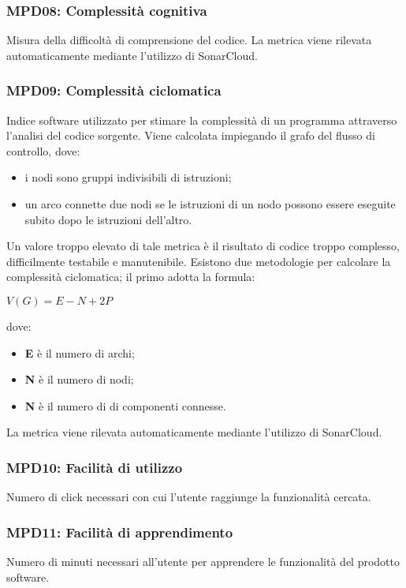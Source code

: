 \subsubsection{MPD08: Complessità cognitiva}
Misura della difficoltà di comprensione del codice.
La metrica viene rilevata automaticamente mediante l’utilizzo di {SonarCloud}\glo.

\subsubsection{MPD09: Complessità ciclomatica}
Indice software utilizzato per stimare la complessità di un programma attraverso l’analisi del codice sorgente.
Viene calcolata impiegando il grafo del flusso di controllo, dove:
\begin{itemize}
    \item i nodi sono gruppi indivisibili di istruzioni;
    \item un arco connette due nodi se le istruzioni di un nodo possono essere eseguite subito dopo le istruzioni dell’altro.
\end{itemize}
Un valore troppo elevato di tale metrica è il risultato di codice troppo complesso, difficilmente testabile e manutenibile.
Esistono due metodologie per calcolare la complessità ciclomatica; il primo adotta la formula:
\begin{center}
    $V(G) = \displaystyle E - N + 2P$
\end{center}
dove:
\begin{itemize}
    \item \textbf{E} è il numero di archi;
    \item \textbf{N} è il numero di nodi;
    \item \textbf{N} è il numero di di componenti connesse.
\end{itemize}
La metrica viene rilevata automaticamente mediante l’utilizzo di {SonarCloud}\glo.

\subsubsection{MPD10: Facilità di utilizzo}
Numero di click necessari con cui l'utente raggiunge la funzionalità cercata.

\subsubsection{MPD11: Facilità di apprendimento}
Numero di minuti necessari all'utente per apprendere le funzionalità del prodotto software.

